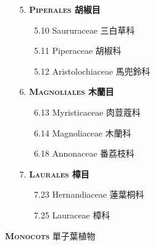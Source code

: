 \begin{enumerate}
  \item[5. ] \textbf{\textsc{Piperales} 胡椒目}   
    \begin{enumerate}
      \item[5.10] Saururaceae 三白草科     
        
      \item[5.11] Piperaceae 胡椒科     
        
      \item[5.12] Aristolochiaceae 馬兜鈴科     
        
    \end{enumerate}
  \item[6. ] \textbf{\textsc{Magnoliales} 木蘭目}   
    \begin{enumerate}
      \item[6.13] Myristicaceae 肉荳蔻科     
        
      \item[6.14] Magnoliaceae 木蘭科     
        
      \item[6.18] Annonaceae 番荔枝科     
        
    \end{enumerate}
  \item[7. ] \textbf{\textsc{Laurales} 樟目}   
    \begin{enumerate}
      \item[7.23] Hernandiaceae 蓮葉桐科     
        
      \item[7.25] Lauraceae 樟科     
        
    \end{enumerate}
\end{enumerate}
\vspace{2ex} 
\noindent \normalsize\textsc{\textbf{Monocots} 單子葉植物}\selectfont \\
\footnotesize\selectfont
